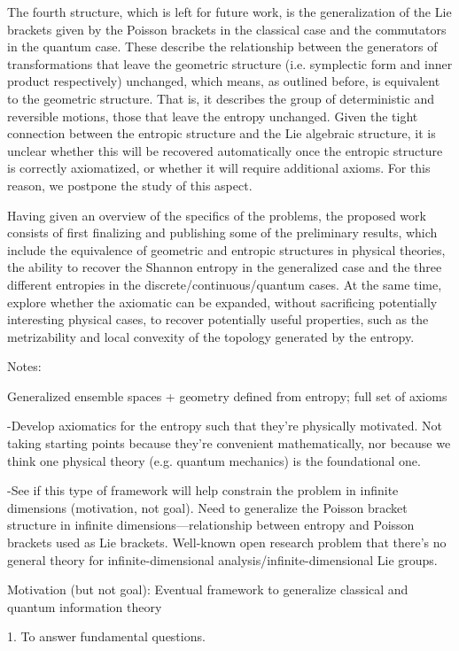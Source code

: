 The fourth structure, which is left for future work, is the generalization of the Lie brackets given by the Poisson brackets in the classical case and the commutators in the quantum case. These describe the relationship between the generators of transformations that leave the geometric structure (i.e. symplectic form and inner product respectively) unchanged, which means, as outlined before, is equivalent to the geometric structure. That is, it describes the group of deterministic and reversible motions, those that leave the entropy unchanged. Given the tight connection between the entropic structure and the Lie algebraic structure, it is unclear whether this will be recovered automatically once the entropic structure is correctly axiomatized, or whether it will require additional axioms. For this reason, we postpone the study of this aspect.

Having given an overview of the specifics of the problems, the proposed work consists of first finalizing and publishing some of the preliminary results, which include the equivalence of geometric and entropic structures in physical theories, the ability to recover the Shannon entropy in the generalized case and the three different entropies in the discrete/continuous/quantum cases. At the same time, explore whether the axiomatic can be expanded, without sacrificing potentially interesting physical cases, to recover potentially useful properties, such as the metrizability and local convexity of the topology generated by the entropy.

Notes:

Generalized ensemble spaces + geometry defined from entropy; full set of axioms

-Develop axiomatics for the entropy such that they’re physically motivated.  Not taking starting points because they’re convenient mathematically, nor because we think one physical theory (e.g. quantum mechanics) is the foundational one.

-See if this type of framework will help constrain the problem in infinite dimensions (motivation, not goal).  Need to generalize the Poisson bracket structure in infinite dimensions—relationship between entropy and Poisson brackets used as Lie brackets.  Well-known open research problem that there’s no general theory for infinite-dimensional analysis/infinite-dimensional Lie groups.

Motivation (but not goal): Eventual framework to generalize classical and quantum information theory

1. To answer fundamental questions.

